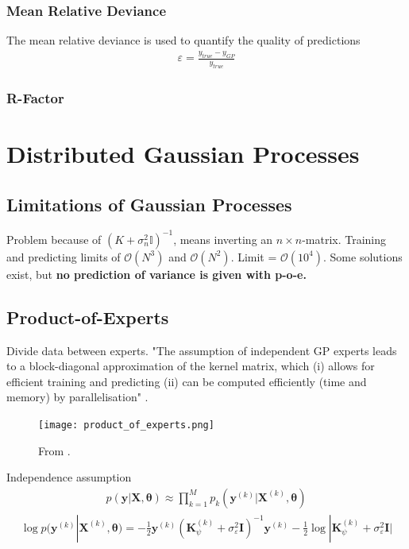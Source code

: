 \documentclass[twoside,english]{uiofysmaster}
\begin{document}
\subsubsection{Mean Relative Deviance}

The mean relative deviance is used to quantify the quality of predictions
\begin{align}
\varepsilon = \frac{y_{true} - y_{GP}}{y_{true}}
\end{align}

\subsubsection{R-Factor}


\section{Distributed Gaussian Processes}

\subsection{Limitations of Gaussian Processes}

Problem because of $(K + \sigma_n^2 \mathbb{I})^{-1}$, means inverting an $n \times n$-matrix. Training and predicting limits of $\mathcal{O}(N^3)$ and $\mathcal{O}(N^2)$. Limit = $\mathcal{O}(10^4)$. Some solutions exist, but \textbf{no prediction of variance is given with p-o-e.}

\subsection{Product-of-Experts}

Divide data between experts. "The assumption of independent GP experts leads to a
block-diagonal approximation of the kernel matrix, which
(i) allows for efficient training and predicting (ii) can be
computed efficiently (time and memory) by parallelisation" \cite{deisenroth2015distributed}.

\begin{figure}
\centering
\texttt{[image: product\_of\_experts.png]}
\caption{From \cite{deisenroth2015distributed}.}
\end{figure}

Independence assumption
\begin{align}
p(\textbf{y} | \textbf{X}, \boldsymbol{\theta}) \approx \prod_{k=1}^M p_k(\textbf{y}^{(k)} | \textbf{X}^{(k)}, \boldsymbol{\theta}) 
\end{align}
\begin{align}
\log p(\textbf{y}^{(k)}|\textbf{X}^{(k)}, \boldsymbol{\theta}) = - \frac{1}{2} \textbf{y}^{(k)} (\textbf{K}_{\psi}^{(k)} + \sigma_{\varepsilon}^2 \textbf{I})^{-1}\textbf{y}^{(k)} - \frac{1}{2} \log
 |\textbf{K}_{\psi}^{(k)} + \sigma_{\varepsilon}^2 \textbf{I} |
\end{align}
\end{document}
